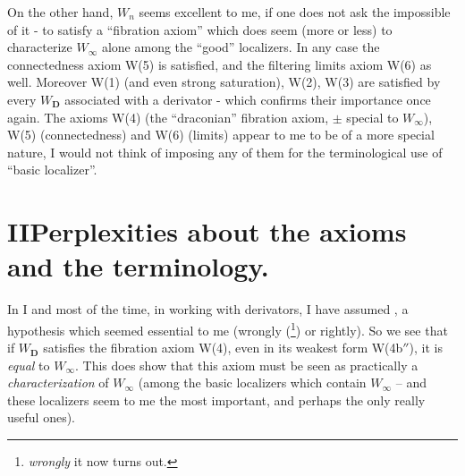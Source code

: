 \documentclass[11pt]{article}
\newcommand{\printedpage}[1]{\marginpar{\footnotesize p.~#1}}
\newcommand{\msp}[1]{\marginpar{\footnotesize [#1]}}
\begin{document}
On the other hand, $W_n$ seems excellent to me, if one does not ask the impossible of it - to satisfy a ``fibration axiom'' which does seem (more or less) to characterize $W_\infty$ alone among the ``good'' localizers. In any case the connectedness axiom W(5) is satisfied, and the filtering limits axiom W(6) as well. Moreover W(1) (and even strong saturation), W(2), W(3) are satisfied by every $W_{\mathbf{D}}$ associated with a derivator - which confirms their importance once again. The axioms W(4) (the ``draconian'' fibration axiom, $\pm$ special to $W_\infty$), W(5) (connectedness) and %
\printedpage{15}
\msp{page 18}W(6) (limits) appear to me to be of a more special nature, I would not think of imposing any of them for the terminological use of ``basic localizer''.

\newpage
\printedpage{16}
\section*{II\quad Perplexities about the axioms and the terminology.}

In I and most of the time, in working with derivators, I have assumed , a hypothesis which seemed essential to me (wrongly (\footnote[38]{\textit{wrongly} it now turns out.}) or rightly). So we see that if $W_{\mathbf{D}}$ satisfies the fibration axiom W(4), even in its weakest form W(4b$''$), it is \textit{equal} to $W_\infty$. This does show that this axiom must be seen as practically a \textit{characterization} of $W_\infty$ (among the basic localizers which contain $W_\infty$ -- and these localizers seem to me the most important, and perhaps the only really useful ones).
\end{document}

